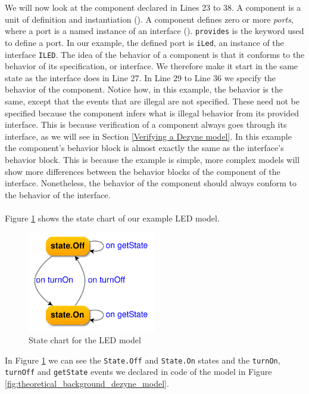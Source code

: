 \documentclass[12pt]{scrreprt}
\begin{document}
\begin{appendices}
We will now look at the component declared in Lines 23 to 38. A component is a unit of definition and instantiation (\cite{dzngloss}). A component defines zero or more \textit{ports}, where a port is a named instance of an interface (\cite{dzngloss}). \texttt{provides} is the keyword used to define a port. In our example, the defined port is \texttt{iLed}, an instance of the interface \texttt{ILED}. The idea of the behavior of a component is that it conforms to the behavior of its specification, or interface. We therefore make it start in the same state as the interface does in Line 27. In Line 29 to Line 36 we specify the behavior of the component. Notice how, in this example, the behavior is the same, except that the events that are illegal are not specified. These need not be specified because the component infers what is illegal behavior from its provided interface. This is because verification of a component always goes through its interface, as we will see in Section \ref{Verifying a Dezyne model}. In this example the component's behavior block is almost exactly the same as the interface's behavior block. This is because the example is simple, more complex models will show more differences between the behavior blocks of the component of the interface. Nonetheless, the behavior of the component should always conform to the behavior of the interface.
\\\\
Figure \ref{fig:led_example_graph} shows the state chart of our example LED model.

\begin{figure}[H]
    \centering
    \includegraphics[width=0.5\textwidth]{Figures/theoretical_background/led_example_graph.png}
    \caption{State chart for the LED model}
    \label{fig:led_example_graph}
\end{figure}

In Figure \ref{fig:led_example_graph} we can see the \texttt{State.Off} and \texttt{State.On} states and  the \texttt{turnOn}, \texttt{turnOff} and \texttt{getState} events we declared in code of the model in Figure \ref{fig:theoretical_background_dezyne_model}.


\end{appendices}
\end{document}

